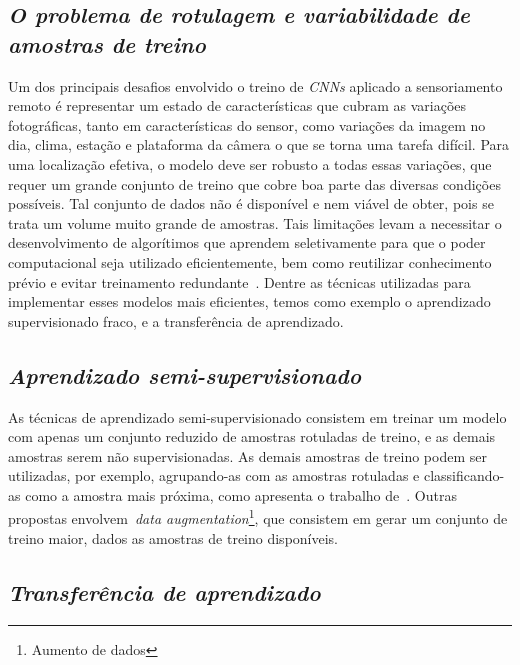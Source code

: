 
\subsection{\textit{O problema de rotulagem e variabilidade de amostras de treino}}\label{sec:Cap2_rotulagem}

Um dos principais desafios envolvido o treino de \textit{CNNs} aplicado a sensoriamento remoto é representar um estado de características que cubram as variações fotográficas, tanto em características do sensor, como variações da imagem no dia, clima, estação e plataforma da câmera o que se torna uma tarefa difícil. Para uma localização efetiva, o modelo deve ser robusto a todas essas variações, que requer um grande conjunto de treino que cobre boa parte das diversas condições possíveis. Tal conjunto de dados não é disponível e nem viável de obter, pois se trata um volume muito grande de amostras. Tais limitações levam a necessitar o desenvolvimento de algorítimos que aprendem seletivamente para que o poder computacional seja utilizado eficientemente, bem como reutilizar conhecimento prévio e evitar treinamento redundante~\cite{rostami2019learning}.  Dentre as técnicas utilizadas para implementar esses modelos mais eficientes, temos como exemplo o aprendizado supervisionado fraco, e a transferência de aprendizado.

\subsection{\textit{Aprendizado semi-supervisionado}}\label{sec:Cap2_semisup}

As técnicas de aprendizado semi-supervisionado consistem em treinar um modelo com apenas um conjunto reduzido de amostras rotuladas de treino, e as demais amostras serem não supervisionadas. As demais amostras de treino podem ser utilizadas, por exemplo, agrupando-as com as amostras rotuladas e classificando-as como a amostra mais próxima, como apresenta o trabalho de~\cite{Sanches2003}. Outras propostas envolvem~\textit{data augmentation}\footnote{Aumento de dados}, que consistem em gerar um conjunto de treino maior, dados as amostras de treino disponíveis.

\subsection{\textit{Transferência de aprendizado}}\label{sec:Cap2_transfer}

